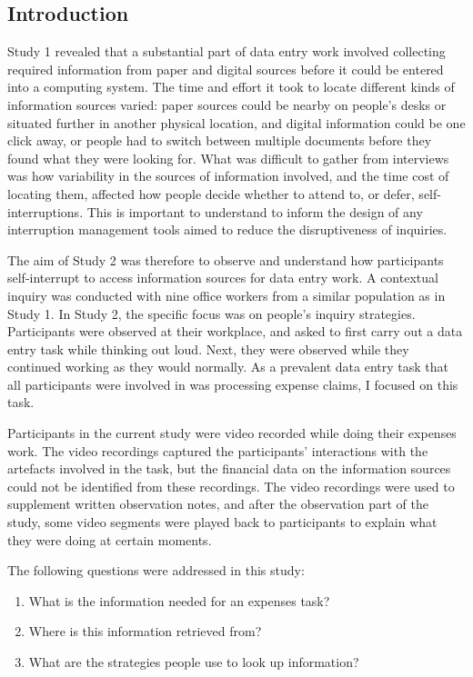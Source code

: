 \subsection{Introduction}
Study 1 revealed that a substantial part of data entry work involved collecting required information from paper and digital sources before it could be entered into a computing system. The time and effort it took to locate different kinds of information sources varied: paper sources could be nearby on people's desks or situated further in another physical location, and digital information could be one click away, or people had to switch between multiple documents before they found what they were looking for. What was difficult to gather from interviews was how variability in the sources of information involved, and the time cost of locating them, affected how people decide whether to attend to, or defer, self-interruptions. This is important to understand to inform the design of any interruption management tools aimed to reduce the disruptiveness of inquiries.


The aim of Study 2 was therefore to observe and understand how participants self-interrupt to access information sources for data entry work. A contextual inquiry was conducted with nine office workers from a similar population as in Study 1. In Study 2, the specific focus was on people's inquiry strategies. Participants were observed at their workplace, and asked to first carry out a data entry task while thinking out loud. Next, they were observed while they continued working as they would normally. As a prevalent data entry task that all participants were involved in was processing expense claims, I focused on this task.

Participants in the current study were video recorded while doing their expenses work. The video recordings captured the participants' interactions with the artefacts involved in the task, but the financial data on the information sources could not be identified from these recordings. The video recordings were used to supplement written observation notes, and after the observation part of the study, some video segments were played back to participants to explain what they were doing at certain moments.

The following questions were addressed in this study:

\begin{enumerate}
\item 
What is the information needed for an expenses task?
\item 
Where is this information retrieved from?
\item 
What are the strategies people use to look up information?
\end{enumerate}

